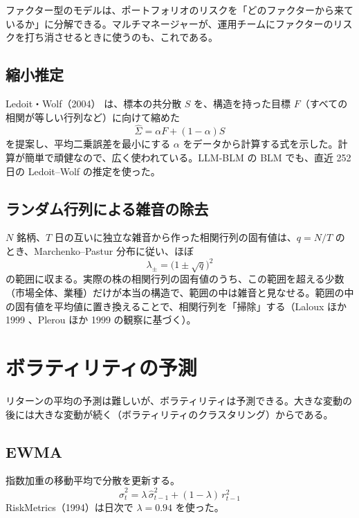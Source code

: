 ファクター型のモデルは、ポートフォリオのリスクを「どのファクターから来ているか」に分解できる。マルチマネージャーが、運用チームにファクターのリスクを打ち消させるときに使うのも、これである。

\subsection{縮小推定}

Ledoit・Wolf（2004）\cite{ledoitwolf2004} は、標本の共分散 $S$ を、構造を持った目標 $F$（すべての相関が等しい行列など）に向けて縮めた
\begin{equation}
\hat\Sigma = \alpha F + (1-\alpha) S
\end{equation}
を提案し、平均二乗誤差を最小にする $\alpha$ をデータから計算する式を示した。計算が簡単で頑健なので、広く使われている。LLM-BLM の BLM でも、直近 252 日の Ledoit--Wolf の推定を使った。

\subsection{ランダム行列による雑音の除去}

$N$ 銘柄、$T$ 日の互いに独立な雑音から作った相関行列の固有値は、$q = N/T$ のとき、Marchenko--Pastur 分布に従い、ほぼ
\begin{equation}
\lambda_\pm = \big(1 \pm \sqrt{q}\big)^2
\end{equation}
の範囲に収まる。実際の株の相関行列の固有値のうち、この範囲を超える少数（市場全体、業種）だけが本当の構造で、範囲の中は雑音と見なせる。範囲の中の固有値を平均値に置き換えることで、相関行列を「掃除」する（Laloux ほか 1999 \cite{laloux1999}、Plerou ほか 1999 \cite{plerou1999} の観察に基づく）。

\section{ボラティリティの予測}

リターンの平均の予測は難しいが、ボラティリティは予測できる。大きな変動の後には大きな変動が続く（ボラティリティのクラスタリング）からである。

\subsection{EWMA}

指数加重の移動平均で分散を更新する。
\begin{equation}
\hat\sigma_t^2 = \lambda\,\hat\sigma_{t-1}^2 + (1-\lambda)\,r_{t-1}^2
\end{equation}
RiskMetrics（1994）は日次で $\lambda = 0.94$ を使った。

